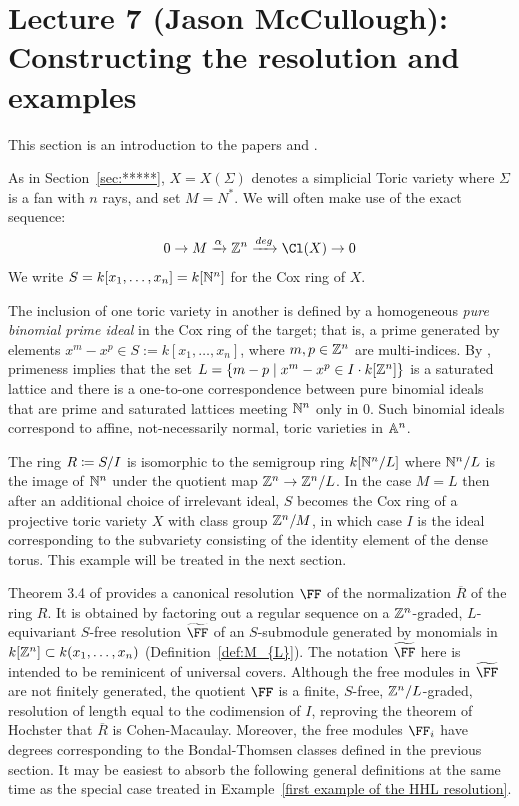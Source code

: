 \documentclass{amsart}
\begin{document}
\fi
\def\tF{{\widetilde \FF}}
\def\BT{{Bondal-Thomsen\ }}

\section{Lecture 7 (Jason McCullough): Constructing the resolution and examples}\label{lec:7-HHL-construction}
This section is an introduction to the papers \cite{BCHSY} and \cite{BH25}.

As in Section~\ref{sec:*****}, $X = X(\Sigma)$ denotes a simplicial Toric variety where $\Sigma$ is a fan with $n$ rays, and set $M = N^{*}$. We will often make use of the exact sequence:
$$
0\to M \xrightarrow {\alpha} \ZZ^{n} \xrightarrow {deg} \Cl(X) \to 0
$$
We write $S = k[x_{1},\dots,x_{n}]= k[\NN^{n}]$ for the Cox ring of $X$.


The inclusion of one toric variety in another is defined by a 
homogeneous \emph{pure binomial prime ideal}
in the Cox ring of the target; that is, a prime generated by elements $x^m-x^p \in S := k[x_1,\dots, x_n]$, where $m,p\in\ZZ^n$ are multi-indices. By \cite{Eisenbud-Sturmfels}, primeness implies that
the set $L = \{m-p\mid x^m-x^p\in I \cdot k[\ZZ^n]\}$ is a saturated lattice and there is a one-to-one correspondence between pure binomial ideals that are prime and saturated lattices meeting
 $\NN^n$ only in 0. Such binomial ideals correspond to affine, not-necessarily normal, toric varieties in $\AA^{n}$. 
 
 The ring $R \ce S/I$ is isomorphic to the semigroup ring $k[\NN^n/L]$ where $\NN^n/L$ is the image of $\NN^n$ under the quotient map $\ZZ^n\rightarrow \ZZ^n/L$.
 In the case $M = L$ then after an additional choice of irrelevant ideal, $S$ becomes the Cox ring of a projective toric variety $X$ with class group $\ZZ^n/M$, in which case $I$ is the ideal corresponding to the subvariety consisting of the identity element of the dense torus. This example will be treated in the next section.


Theorem 3.4 of \cite{BCHSY} provides a canonical  resolution $\FF$ of the normalization $\overline R$
of the ring $R$. It is obtained by factoring out a regular sequence on a $\ZZ^{n}$-graded, $L$-equivariant $S$-free resolution $\tF$
of an $S$-submodule generated by monomials in $k[\ZZ^n] \subset k(x_{1}, \dots, x_{n})$ (Definition~\ref{def:M_{L}}).
The notation $\tF$ here is intended to be reminicent of universal covers.
Although the free modules in $\tF$ are not finitely generated, the quotient $\FF$
is a finite, $S$-free, $\ZZ^{n}/L$-graded, resolution of length equal to the 
codimension of $I$, reproving the theorem of Hochster that
$\overline R$ is Cohen-Macaulay. Moreover, the free modules $\FF_{i}$ have degrees
corresponding to the Bondal-Thomsen classes defined in the previous section. It may be easiest to
absorb the following general definitions at the same time as the special case treated in Example~\ref{first example of the HHL resolution}.
\end{document}
